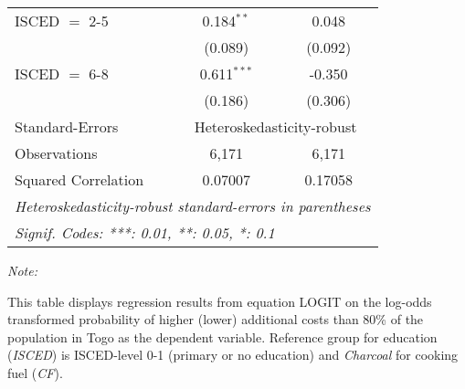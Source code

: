 \begin{table}[htbp!]
\begin{adjustbox}{width = 1\textwidth, max height = 0.95\textheight, center}
\begin{threeparttable}[b]
\begin{tabular}{lcc}
            ISCED $=$ 2-5        & 0.184$^{**}$   & 0.048\\   
                                 & (0.089)        & (0.092)\\   
            ISCED $=$ 6-8        & 0.611$^{***}$  & -0.350\\   
                                 & (0.186)        & (0.306)\\   
            \midrule 
            Standard-Errors & \multicolumn{2}{c}{Heteroskedasticity-robust} \\ 
            Observations         & 6,171          & 6,171\\  
            Squared Correlation  & 0.07007        & 0.17058\\  
            \midrule \midrule
            \multicolumn{3}{l}{\emph{Heteroskedasticity-robust standard-errors in parentheses}}\\
            \multicolumn{3}{l}{\emph{Signif. Codes: ***: 0.01, **: 0.05, *: 0.1}}\\
         \end{tabular}
         
         \begin{tablenotes}\item \medskip \textit{Note:}
            \item This table displays regression results from equation LOGIT on the log-odds transformed probability of higher (lower) additional costs than 80\% of the population in Togo as the dependent variable. Reference group for education (\textit{ISCED}) is ISCED-level 0-1 (primary or no education) and \textit{Charcoal} for cooking fuel (\textit{CF}).
         \end{tablenotes}
      \end{threeparttable}
   \end{adjustbox}
\end{table}


